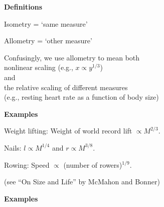  \textbf{Definitions}

Isometry = `same measure'

Allometry = `other measure'

Confusingly, we use allometry to mean both\\
 nonlinear scaling (e.g., $x \propto y^{1/3}$)\\
and\\
 the relative scaling of different measures\\
(e.g., resting heart rate as a function of body size)


  \textbf{Examples}



Weight lifting: Weight of world record lift  $\propto M^{2/3}.$

Nails: $l \propto M^{1/4}$ and $r \propto M^{3/8}$.

Rowing: Speed $\propto $ (number of rowers)$^{1/9}$.

{\tiny (see ``On Size and Life'' by McMahon and Bonner)}


  \textbf{Examples}

